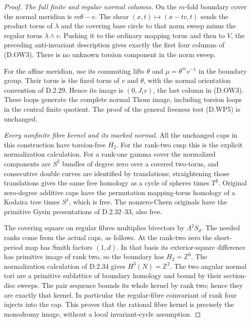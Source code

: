 \begin{proof}
\emph{The full finite and regular normal columns.}
On the $m$-fold boundary cover the normal meridian
is $m\theta-v$. The shear
$(x,t)\mapsto(x-tv,t)$ sends the product torus
of $\lambda$ and the covering base circle to
that norm sweep minus the regular torus
$\lambda\wedge v$. Pushing it to the ordinary
mapping torus and then to $V$, the preceding
anti-invariant description gives exactly the
first four columns of (D.OW3).
There is no unknown torsion component in the
norm sweep.

For the affine meridian, use its commuting lifts
$\theta$ and $\mu=\theta^m v^{-1}$ in the boundary
group. Their torus is the fixed torus of $v$
and $\theta$, with the normal orientation
convention of D.2.29. Hence its image is
$(0,J_iv)$, the last column in (D.OW3).
These loops generate the complete normal Thom
image, including torsion loops in the central
finite quotient. The proof of the general
freeness test (D.WP5) is unchanged.

\emph{Every nonfinite fibre kernel and its marked normal.}
All the unchanged caps in this construction have
torsion-free $H_2$. For the rank-two cusp this is
the explicit normalization calculation. For a
rank-one gamma cover the normalized components
are $S^2$ bundles of degree zero over a covered
two-torus, and consecutive double curves are
identified by translations; straightening those
translations gives the same free homology as a
cycle of spheres times $T^2$. Original
zero-degree additive caps have the permutation
mapping-torus homology of a Kodaira tree times
$S^1$, which is free. The nonzero-Chern originals
have the primitive Gysin presentations of
D.2.32--33, also free.

The covering square on regular fibres multiplies
bivectors by $\Lambda^2S_d$. The needed ranks come
from the actual caps, as follows. At the rank-two
zero the short-period map has Smith factors $(1,d)$.
In that basis its exterior-square difference has
primitive image of rank two, so the boundary has
$H_2=\mathbb Z^6$. The normalization calculation of
D.2.34 gives $H^3(N)=\mathbb Z^2$. The two angular
normal tori are a primitive sublattice of boundary
homology and bound by their section-disc sweeps.
The pair sequence bounds its whole kernel by rank
two; hence they are exactly that kernel. In
particular the regular-fibre coinvariant of rank
four injects into the cap. This proves that the
rational fibre kernel is precisely the monodromy
image, without a local invariant-cycle assumption.


\end{proof}
